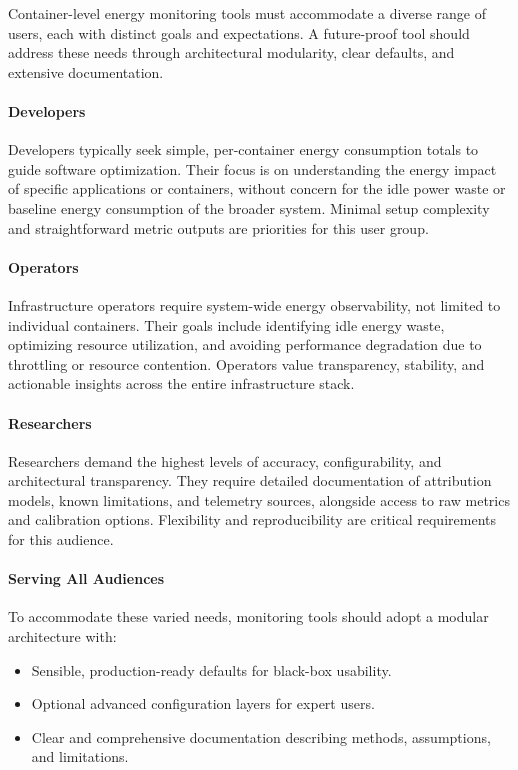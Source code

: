 Container-level energy monitoring tools must accommodate a diverse range of users, each with distinct goals and expectations. A future-proof tool should address these needs through architectural modularity, clear defaults, and extensive documentation.

\paragraph{Developers}
Developers typically seek simple, per-container energy consumption totals to guide software optimization. Their focus is on understanding the energy impact of specific applications or containers, without concern for the idle power waste or baseline energy consumption of the broader system. Minimal setup complexity and straightforward metric outputs are priorities for this user group.

\paragraph{Operators}
Infrastructure operators require system-wide energy observability, not limited to individual containers. Their goals include identifying idle energy waste, optimizing resource utilization, and avoiding performance degradation due to throttling or resource contention. Operators value transparency, stability, and actionable insights across the entire infrastructure stack.

\paragraph{Researchers}
Researchers demand the highest levels of accuracy, configurability, and architectural transparency. They require detailed documentation of attribution models, known limitations, and telemetry sources, alongside access to raw metrics and calibration options. Flexibility and reproducibility are critical requirements for this audience.

\paragraph{Serving All Audiences}
To accommodate these varied needs, monitoring tools should adopt a modular architecture with:
\begin{itemize}
    \item Sensible, production-ready defaults for black-box usability.
    \item Optional advanced configuration layers for expert users.
    \item Clear and comprehensive documentation describing methods, assumptions, and limitations.
\end{itemize}

